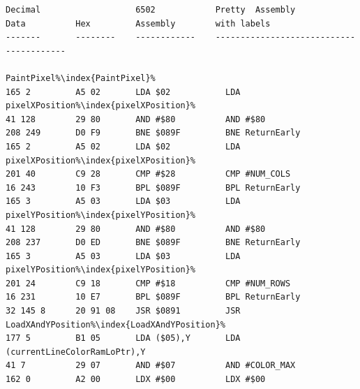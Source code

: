 \lstset{style=6502Style}
\begin{lstlisting}[basicstyle=\ttfamily\scriptsize,escapechar=\%]
Decimal                   6502            Pretty  Assembly
Data          Hex         Assembly        with labels
-------       --------    ------------    ----------------------------------------
                                          PaintPixel%\index{PaintPixel}%                                       
165 2         A5 02       LDA $02           LDA pixelXPosition%\index{pixelXPosition}%                               
41 128        29 80       AND #$80          AND #$80
208 249       D0 F9       BNE $089F         BNE ReturnEarly                                  
165 2         A5 02       LDA $02           LDA pixelXPosition%\index{pixelXPosition}%                               
201 40        C9 28       CMP #$28          CMP #NUM_COLS                                    
16 243        10 F3       BPL $089F         BPL ReturnEarly                                  
165 3         A5 03       LDA $03           LDA pixelYPosition%\index{pixelYPosition}%                               
41 128        29 80       AND #$80          AND #$80
208 237       D0 ED       BNE $089F         BNE ReturnEarly                                  
165 3         A5 03       LDA $03           LDA pixelYPosition%\index{pixelYPosition}%                               
201 24        C9 18       CMP #$18          CMP #NUM_ROWS                                    
16 231        10 E7       BPL $089F         BPL ReturnEarly                                  
32 145 8      20 91 08    JSR $0891         JSR LoadXAndYPosition%\index{LoadXAndYPosition}%                            
177 5         B1 05       LDA ($05),Y       LDA (currentLineColorRamLoPtr),Y       
41 7          29 07       AND #$07          AND #COLOR_MAX                                   
162 0         A2 00       LDX #$00          LDX #$00                                         
\end{lstlisting}
\clearpage
